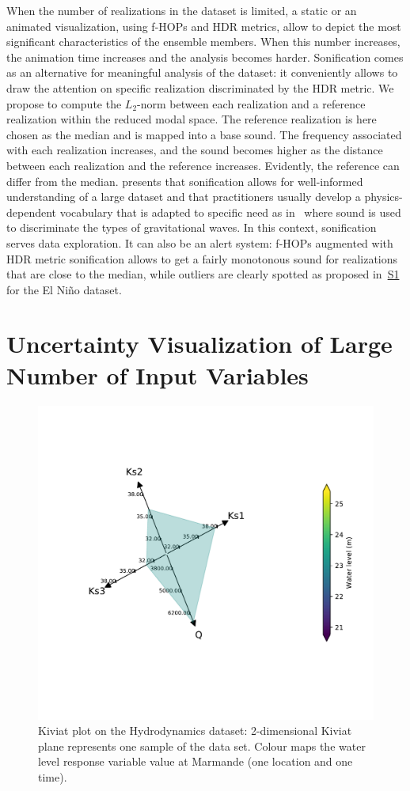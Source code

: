 When the number of realizations in the dataset is limited, a static or an animated visualization, using f-HOPs and HDR metrics, allow to depict the most significant characteristics of the ensemble members. When this number increases, the animation time increases and the analysis becomes harder. Sonification comes as an alternative for meaningful analysis of the dataset: it conveniently allows to draw the attention on specific realization discriminated by the HDR metric. We propose to compute the $L_2$-norm between each realization and a reference realization within the reduced modal space.  The reference realization is here chosen as the median and is mapped into a base sound. The frequency associated with each realization increases, and the sound becomes higher as the distance between each realization and the reference increases. Evidently, the reference can differ from the median. 
\citep{Alexander2014} presents that sonification allows for well-informed understanding of a large dataset and that practitioners usually develop a physics-dependent vocabulary that is adapted to specific need as in~\citep{Hughes2003} where sound is used to discriminate the types of gravitational waves. In this context, sonification serves data exploration. It  can also be an alert system: f-HOPs augmented with HDR metric sonification allows to get a fairly monotonous sound for realizations that are close to the median, while outliers are clearly spotted as proposed in~\hyperref[S1]{S1} for the El Ni\~no dataset.

\section{Uncertainty Visualization of Large Number of Input Variables}
\label{sec:input}

\begin{figure}[!h]
\centering
\includegraphics[width=0.8\linewidth,keepaspectratio]{fig/contributions/visu/mascaret_2D.pdf}
\caption{Kiviat plot on the Hydrodynamics dataset: 2-dimensional Kiviat plane represents one sample of the data set. Colour maps the water level response variable value at Marmande (one location and one time).}
\label{fig:Kiviat_color}
\end{figure}

